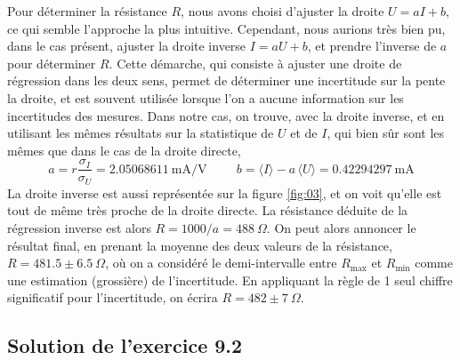 Pour déterminer la résistance $R$, nous avons choisi d'ajuster la droite $U=aI+b$, ce qui semble l'approche la plus intuitive. Cependant, nous aurions très bien pu, dans le cas présent, ajuster la droite inverse $I=aU+b$, et prendre l'inverse de $a$ pour déterminer $R$. Cette démarche, qui consiste à ajuster une droite de régression dans les deux sens, permet de déterminer une incertitude sur la pente la droite, et est souvent utilisée lorsque l'on a aucune information sur les incertitudes des mesures. Dans notre cas, on trouve, avec la droite inverse, et en utilisant les mêmes résultats sur la statistique de $U$ et de $I$, qui bien sûr sont les mêmes que dans le cas de la droite directe,
$$
a=r\frac{\sigma_I}{\sigma_U}=2.05068611\ \text{mA/V}\hspace{1cm}
b=\langle I \rangle-a\,\langle U \rangle=0.42294297\ \text{mA}
$$
La droite inverse est aussi représentée sur la figure \ref{fig:03}, et on voit qu'elle est tout de même très proche de la droite directe. La résistance déduite de la régression inverse est alors $R=1000/a=488\ \Omega$. On peut alors annoncer le résultat final, en prenant la moyenne des deux valeurs de la résistance, $R=481.5\pm6.5\ \Omega$, où on a considéré le demi-intervalle entre $R_{\text{max}}$ et $R_{\text{min}}$ comme une estimation (grossière) de l'incertitude. En appliquant la règle de 1 seul chiffre significatif pour l'incertitude, on écrira $R=482\pm7\ \Omega$.

\subsection*{Solution de l'exercice 9.2}

